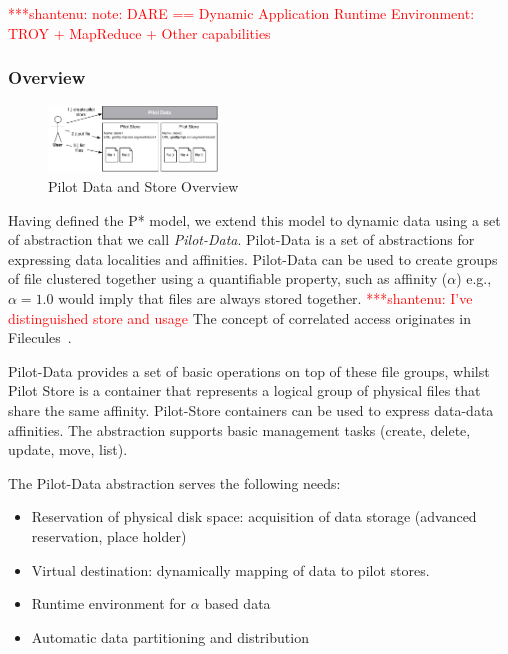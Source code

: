 \documentclass[conference,final]{IEEEtran}
\newcommand{\jhanote}[1]{ {\textcolor{red} { ***shantenu: #1 }}}
\newcommand{\jhanote}[1]{}
\begin{document}
\jhanote{note: DARE == Dynamic Application Runtime Environment: TROY +
  MapReduce + Other capabilities}


\subsubsection{Overview}

\begin{figure}[t]
    \centering
        \includegraphics[width=0.4\textwidth]{figures/pilotstore.pdf}
    \caption{Pilot Data and Store Overview}
    \label{fig:figures_pilotstore}
\end{figure}

Having defined the P* model, we extend this model to dynamic data using a set of 
abstraction that we call \emph{Pilot-Data}. Pilot-Data is a set of abstractions 
for expressing data localities and affinities. Pilot-Data can be used to create 
groups of file clustered together using a quantifiable property, such as 
affinity ($\alpha$) e.g., $\alpha = 1.0$ would imply that files are always 
stored together. \jhanote{I've distinguished store and usage} The concept of
correlated access originates in
Filecules~\cite{Doraimani:2008:FGS:1383422.1383429}.

Pilot-Data provides a set of basic operations on top of these file
groups, whilst Pilot Store is a container that represents a logical
group of physical files that share the same affinity. Pilot-Store 
containers can be used to express data-data affinities. The abstraction 
supports basic management tasks (create, delete, update,
move, list). 


The Pilot-Data abstraction serves the following needs:
\begin{itemize}
	\item Reservation of physical disk space: acquisition of data storage (advanced reservation, place holder)
	\item Virtual destination: dynamically mapping of data to pilot stores.
	\item Runtime environment for $\alpha$ based data
	\item Automatic data partitioning and distribution
\end{itemize}
\end{document}
